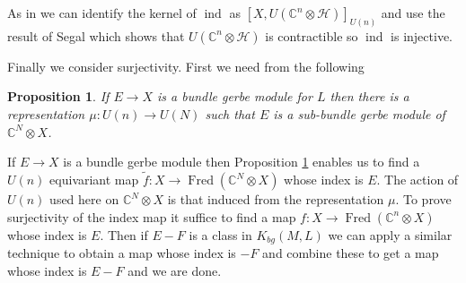 \documentclass[a4paper,reqno]{amsart}
\DeclareMathOperator{\Fred}{Fred}
\DeclareMathOperator{\ind}{ind}
\theoremstyle{plain}
\newtheorem{proposition}[theorem]{Proposition}
\theoremstyle{definition}
\theoremstyle{remark}
\numberwithin{equation}{section}
\numberwithin{figure}{section}
\newcommand{\cH}{{\mathcal H}}
\newcommand{\CC}{{\mathbb C}}
\newcommand{\<}{\langle}
\renewcommand{\>}{\rangle}
\begin{document}
As in \cite{Ati} we can identify the kernel of $\ind$ as
$ [X, U(\CC^n \otimes \cH ) ] _{U(n)}$ and use the result of Segal \cite{Seg2}
which shows that $U(\CC^n \otimes \cH )$ is contractible so $\ind$ is
injective.

Finally we consider surjectivity. First we need from \cite{Seg1} the following
\begin{proposition}
\label{prop:sub}
If $E \to X$ is a bundle gerbe module for $L$ then there is a representation
$\mu\colon U(n) \to U(N)$ such that $E$ is a sub-bundle gerbe module of
$\CC^N \otimes X$.
\end{proposition}

If $E \to X$ is a bundle gerbe module then Proposition \ref{prop:sub}
enables us to find a $U(n)$
equivariant map $\tilde f \colon X \to \Fred(\CC^N \otimes X)$ whose
index is $E$.
The action of $U(n)$ used here on $\CC^N \otimes X$ is that induced from the
representation $\mu$.
To prove surjectivity of the index map it suffice to find a
map $f \colon X \to \Fred(\CC^n \otimes X)$
whose index is $E$. Then if $E-F$ is a class in $K_{bg}(M, L)$ we can
apply a similar technique
to obtain a map whose index is $-F$ and combine these to get a map
whose index is $E-F$ and we are done.
\end{document}
